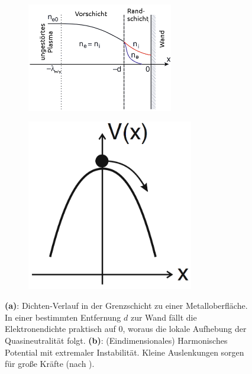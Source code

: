 \documentclass[numbers=noenddot,a4paper,notitlepage,twoside,BCOR15mm]{scrbook}
\newcommand{\fett}[1]{\textbf{#1}}
\begin{document}
				\begin{figure}
					\centering
					\begin{subfigure}[b]{0.6\textwidth}
						\centering
						\includegraphics[width=0.7\textwidth,height=0.5\textwidth]{figs/randschichtpiel.png}
						\caption{}
						\label{img:dichterand}
					\end{subfigure}
					\begin{subfigure}[b]{0.375\textwidth}
						\centering
						\includegraphics[width=0.8\textwidth,height=0.8\textwidth]{figs/parabelpiel.png}
						\caption{}
						\label{img:parab}
					\end{subfigure}
					\caption{\fett{(a)}: Dichten-Verlauf in der Grenzschicht zu einer Metalloberfläche. In einer bestimmten Entfernung $d$ zur Wand fällt die Elektronendichte praktisch auf 0, woraus die lokale Aufhebung der Quasineutralität folgt. \fett{(b)}: (Eindimensionales) Harmonisches Potential mit extremaler Instabilität. Kleine Auslenkungen sorgen für große Kräfte (nach \cite{Piel10}).}
				\end{figure}
\end{document}

